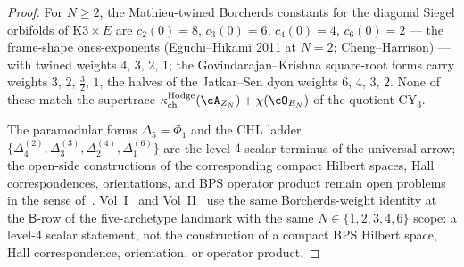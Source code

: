 \begin{proof}
For $N \geq 2$, the Mathieu-twined Borcherds constants for the
diagonal Siegel orbifolds of $\mathrm{K3}\times E$ are $c_2(0) = 8$,
$c_3(0) = 6$, $c_4(0) = 4$, $c_6(0) = 2$ --- the frame-shape
ones-exponents (Eguchi--Hikami 2011 at $N = 2$; Cheng--Harrison) ---
with twined weights $4$, $3$, $2$, $1$; the Govindarajan--Krishna
square-root forms carry weights $3$, $2$, $\tfrac32$, $1$, the halves
of the Jatkar--Sen dyon weights $6$, $4$, $3$, $2$. None of these match the supertrace
$\kappa_{\mathrm{ch}}^{\mathrm{Hodge}}(\cA_{Z_N}) + \chi(\cO_{E_N})$ of the quotient
CY$_3$.

The paramodular forms $\Delta_5 = \Phi_1$ and the CHL ladder
$\{\Delta_4^{(2)}, \Delta_3^{(3)}, \Delta_2^{(4)}, \Delta_1^{(6)}\}$ are
the level-$4$ scalar terminus of the universal arrow; the open-side
constructions of the corresponding compact Hilbert spaces, Hall
correspondences, orientations, and BPS operator product remain open
problems in the sense of~\cite{LorgatIgusaCuspForm}. Vol~I~\cite{VolI}
and Vol~II~\cite{VolII} use the same Borcherds-weight identity at the
$\mathsf{B}$-row of the five-archetype landmark with the same
$N \in \{1, 2, 3, 4, 6\}$ scope: a level-$4$ scalar statement, not the
construction of a compact BPS Hilbert space, Hall correspondence,
orientation, or operator product.
\end{proof}

\providecommand{\MpFour}{\mathrm{Mp}_4}
\providecommand{\SpFour}{\mathrm{Sp}_4}
\providecommand{\MpFourTilde}{\widetilde{\mathrm{Mp}}_4}

